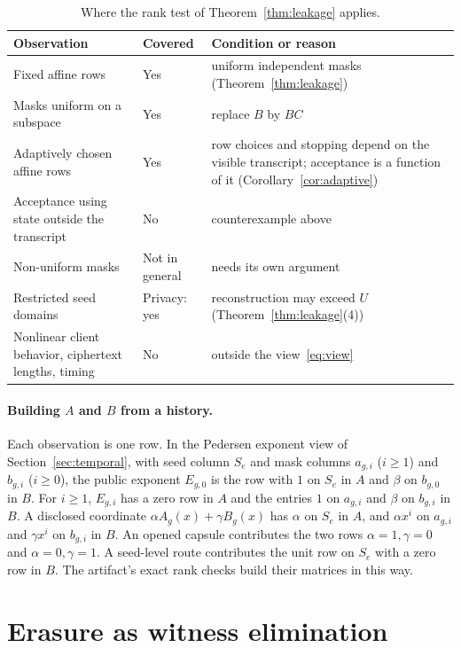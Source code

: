 \documentclass[pdflatex,sn-mathphys-num,twocolumn]{sn-jnl}
\theoremstyle{plain}
\theoremstyle{definition}
\begin{document}
\begin{table}[t]
\caption{Where the rank test of Theorem~\ref{thm:leakage} applies.}\label{tab:rankscope}
\centering\footnotesize
\begin{tabularx}{\linewidth}{@{}>{\raggedright\arraybackslash}p{.30\linewidth}>{\raggedright\arraybackslash}p{.12\linewidth}Y@{}}\toprule
Observation & Covered & Condition or reason\\\midrule
Fixed affine rows & Yes & uniform independent masks (Theorem~\ref{thm:leakage})\\
Masks uniform on a subspace & Yes & replace $B$ by $BC$\\
Adaptively chosen affine rows & Yes & row choices and stopping depend on the visible transcript; acceptance is a function of it (Corollary~\ref{cor:adaptive})\\
Acceptance using state outside the transcript & No & counterexample above\\
Non-uniform masks & Not in general & needs its own argument\\
Restricted seed domains & Privacy: yes & reconstruction may exceed $U$ (Theorem~\ref{thm:leakage}(4))\\
Nonlinear client behavior, ciphertext lengths, timing & No & outside the view~\eqref{eq:view}\\\bottomrule
\end{tabularx}
\end{table}

\paragraph{Building $A$ and $B$ from a history.}
Each observation is one row. In the Pedersen exponent view of Section~\ref{sec:temporal}, with seed column $S_e$ and mask columns $a_{g,i}$ ($i\ge1$) and $b_{g,i}$ ($i\ge0$), the public exponent $E_{g,0}$ is the row with $1$ on $S_e$ in $A$ and $\beta$ on $b_{g,0}$ in $B$. For $i\ge1$, $E_{g,i}$ has a zero row in $A$ and the entries $1$ on $a_{g,i}$ and $\beta$ on $b_{g,i}$ in $B$. A disclosed coordinate $\alpha A_g(x)+\gamma B_g(x)$ has $\alpha$ on $S_e$ in $A$, and $\alpha x^i$ on $a_{g,i}$ and $\gamma x^i$ on $b_{g,i}$ in $B$. An opened capsule contributes the two rows $\alpha=1,\gamma=0$ and $\alpha=0,\gamma=1$. A seed-level route contributes the unit row on $S_e$ with a zero row in $B$. The artifact's exact rank checks build their matrices in this way.


\section{Erasure as witness elimination}\label{sec:erasure}
\end{document}
